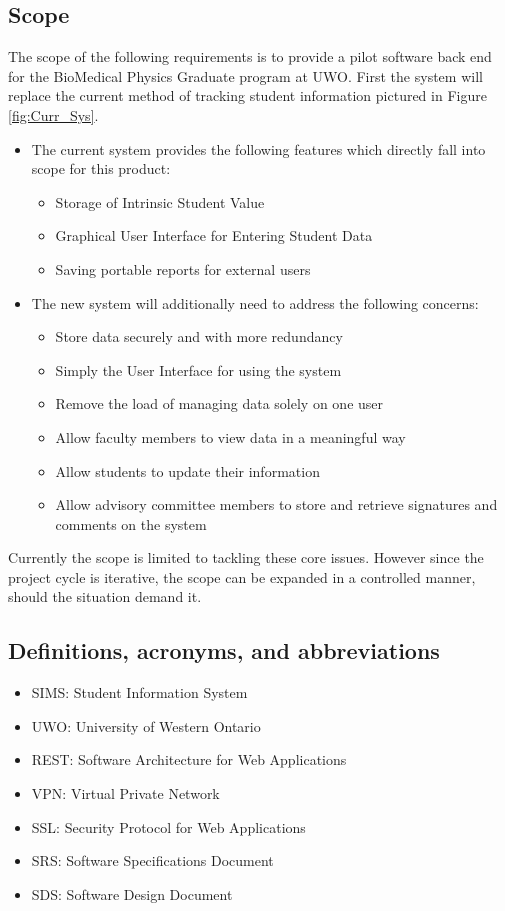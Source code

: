 \documentclass[11pt,a4paper]{report}
\begin{document}
\subsection{Scope}
The scope of the following requirements is to provide a pilot software back end for the BioMedical Physics
Graduate program at UWO. First the system will replace the current method of tracking student information
pictured in Figure \ref{fig:Curr_Sys}.
\begin{itemize}
\item The current system provides the following features which directly fall into scope for this product:
\begin{itemize}
\item Storage of Intrinsic Student Value
\item Graphical User Interface for Entering Student Data
\item Saving portable reports for external users
\end{itemize}
\item The new system will additionally need to address the following concerns:
\begin{itemize} 
\item Store data securely and with more redundancy
\item Simply the User Interface for using the system
\item Remove the load of managing data solely on one user
\item Allow faculty members to view data in a meaningful way
\item Allow students to update their information
\item Allow advisory committee members to store and retrieve signatures and comments on the system
\end{itemize} 
\end{itemize}
Currently the scope is limited to tackling these core issues. However since the project cycle is iterative,
the scope can be expanded in a controlled manner, should the situation demand it.
\subsection{Definitions, acronyms, and abbreviations}
\begin{itemize}
\item SIMS: Student Information System
\item UWO: University of Western Ontario
\item REST: Software Architecture for Web Applications
\item VPN: Virtual Private Network
\item SSL: Security Protocol for Web Applications
\item SRS: Software Specifications Document 
\item SDS: Software Design Document 
\end{itemize}
\end{document}
